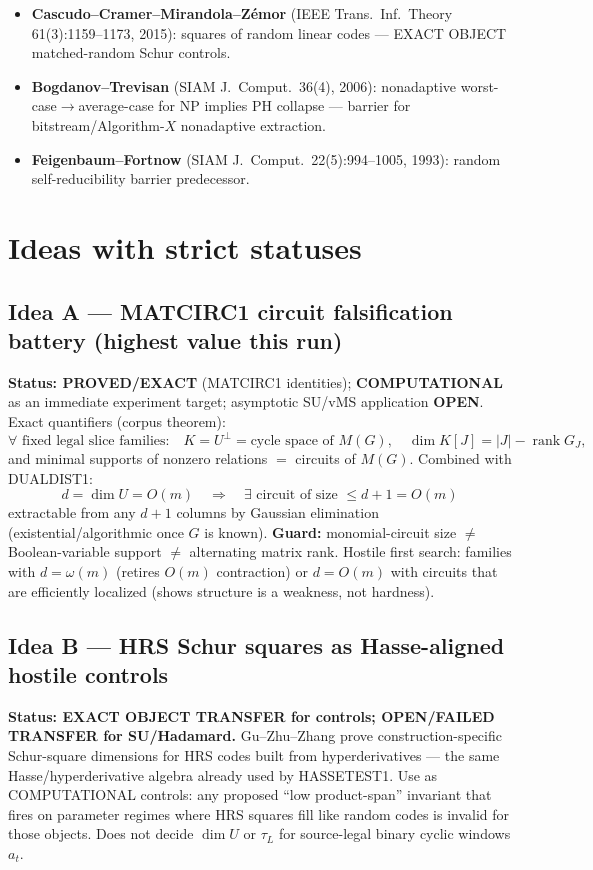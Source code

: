 \documentclass[11pt]{article}
\begin{document}
\begin{itemize}
distinguisher and Schur products --- graded Betti / shortening diagnostics are
\textbf{ANALOGY/CANDIDATE}; structure can be algorithmically exploitable (aligns with MATCIRC1
hostile interpretation).
\item \textbf{Cascudo--Cramer--Mirandola--Z\'emor} (IEEE Trans.\ Inf.\ Theory 61(3):1159--1173, 2015):
squares of random linear codes --- EXACT OBJECT matched-random Schur controls.
\item \textbf{Bogdanov--Trevisan} (SIAM J.\ Comput.\ 36(4), 2006): nonadaptive worst-case$\to$average-case
for NP implies PH collapse --- barrier for bitstream/Algorithm-$X$ nonadaptive extraction.
\item \textbf{Feigenbaum--Fortnow} (SIAM J.\ Comput.\ 22(5):994--1005, 1993): random self-reducibility
barrier predecessor.
\end{itemize}

\section*{Ideas with strict statuses}
\subsection*{Idea A --- MATCIRC1 circuit falsification battery (highest value this run)}
\textbf{Status: PROVED/EXACT} (MATCIRC1 identities); \textbf{COMPUTATIONAL} as an immediate
experiment target; asymptotic SU/vMS application \textbf{OPEN}.
Exact quantifiers (corpus theorem):
\[
\forall\text{ fixed legal slice families:}\quad
K=U^\perp=\text{cycle space of }M(G),\quad
\dim K[J]=|J|-\operatorname{rank}G_J,
\]
and minimal supports of nonzero relations $=$ circuits of $M(G)$.
Combined with DUALDIST1:
\[
d=\dim U=O(m)\quad\Rightarrow\quad
\exists\text{ circuit of size }\le d+1=O(m)
\]
extractable from any $d+1$ columns by Gaussian elimination (existential/algorithmic once $G$ is known).
\textbf{Guard:} monomial-circuit size $\neq$ Boolean-variable support $\neq$ alternating matrix rank.
Hostile first search: families with $d=\omega(m)$ (retires $O(m)$ contraction) or $d=O(m)$ with
circuits that are efficiently localized (shows structure is a weakness, not hardness).

\subsection*{Idea B --- HRS Schur squares as Hasse-aligned hostile controls}
\textbf{Status: EXACT OBJECT TRANSFER for controls; OPEN/FAILED TRANSFER for SU/Hadamard.}
Gu--Zhu--Zhang prove construction-specific Schur-square dimensions for HRS codes built from
hyperderivatives --- the same Hasse/hyperderivative algebra already used by HASSETEST1.
Use as COMPUTATIONAL controls: any proposed ``low product-span'' invariant that fires on
parameter regimes where HRS squares fill like random codes is invalid for those objects.
Does not decide $\dim U$ or $\tau_L$ for source-legal binary cyclic windows $a_t$.
\end{document}
